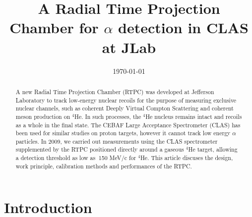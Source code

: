 \documentclass[twocolumn,showpacs,superscriptaddress,groupedaddress]{revtex4}
\begin{document}
\title{\vspace{-15mm}\fontsize{24pt}{10pt}\selectfont\textbf{A Radial Time 
Projection Chamber for $\alpha$ detection in CLAS at JLab}}
  

\date{\today}

\begin{abstract}
A new Radial Time Projection Chamber (RTPC) was developed at Jefferson 
Laboratory to track low-energy nuclear recoils for the purpose of measuring
exclusive nuclear channels, such as coherent Deeply Virtual Compton Scattering
and coherent meson production on $^4$He. In such processes, the $^4$He nucleus
remains intact and recoils as a whole in the final state. The CEBAF Large
Acceptance Spectrometer (CLAS) has been used for similar studies on proton
targets, however it cannot track low energy $\alpha$ particles. In
2009, we carried out measurements using the CLAS spectrometer supplemented by
the RTPC positioned directly around a gaseous $^4$He target, allowing a detection
threshold as low as $~$150  MeV/c for $^4$He. This article discuses the design,
work principle, calibration methods and performances of the RTPC.
\end{abstract}

\maketitle

\section{Introduction} \label{sec:level1}
\end{document}
